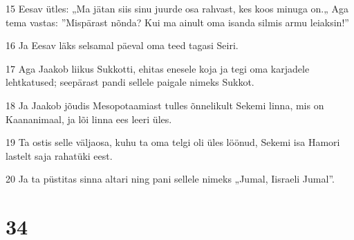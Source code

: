 \par 15 Eesav ütles: „Ma jätan siis sinu juurde osa rahvast, kes koos minuga on.„ Aga tema vastas: ”Mispärast nõnda? Kui ma ainult oma isanda silmis armu leiaksin!”
\par 16 Ja Eesav läks selsamal päeval oma teed tagasi Seiri.
\par 17 Aga Jaakob liikus Sukkotti, ehitas enesele koja ja tegi oma karjadele lehtkatused; seepärast pandi sellele paigale nimeks Sukkot.
\par 18 Ja Jaakob jõudis Mesopotaamiast tulles õnnelikult Sekemi linna, mis on Kaananimaal, ja lõi linna ees leeri üles.
\par 19 Ta ostis selle väljaosa, kuhu ta oma telgi oli üles löönud, Sekemi isa Hamori lastelt saja rahatüki eest.
\par 20 Ja ta püstitas sinna altari ning pani sellele nimeks „Jumal, Iisraeli Jumal”.

\chapter{34}

